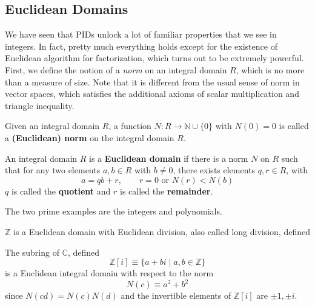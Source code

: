 \subsection{Euclidean Domains}

  We have seen that PIDs unlock a lot of familiar properties that we see in integers. In fact, pretty much everything holds except for the existence of Euclidean algorithm for factorization, which turns out to be extremely powerful. First, we define the notion of a \textit{norm} on an integral domain $R$, which is no more than a measure of size. Note that it is different from the usual sense of norm in vector spaces, which satisfies the additional axioms of scalar multiplication and triangle inequality. 

  \begin{definition}
    Given an integral domain $R$, a function $N: R \to \mathbb{N} \cup \{0\}$ with $N(0) = 0$ is called a \textbf{(Euclidean) norm} on the integral domain $R$. 
  \end{definition}

  \begin{definition}
    An integral domain $R$ is a \textbf{Euclidean domain} if there is a norm $N$ on $R$ such that for any two elements $a, b \in R$ with $b \neq 0$, there exists elements $q, r \in R$, with 
    \begin{equation}
      a = qb + r, \qquad r = 0 \text{ or } N(r) < N(b) 
    \end{equation}
    $q$ is called the \textbf{quotient} and $r$ is called the \textbf{remainder}. 
  \end{definition}

  The two prime examples are the integers and polynomials. 

  \begin{example}[Integers]
    $\mathbb{Z}$ is a Euclidean domain with Euclidean division, also called long division, defined 

    \begin{center}
    \end{center}
  \end{example}

  \begin{example}
    The subring of $\mathbb{C}$, defined
    \begin{equation}
      \mathbb{Z}[i] \equiv \{ a + b i \mid a, b \in \mathbb{Z} \}
    \end{equation}
    is a Euclidean integral domain with respect to the norm 
    \begin{equation}
      N(c) \equiv a^2 + b^2
    \end{equation}
    since $N(c d) = N(c) N(d)$ and the invertible elements of $\mathbb{Z}[i]$ are $\pm 1, \pm i$. 
  \end{example}

